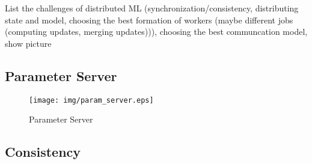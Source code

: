 List the challenges of distributed ML (synchronization/consistency, distributing state and model, choosing the best formation of workers (maybe different jobs (computing updates, merging updates))), choosing the best communcation model, show picture


\subsection{Parameter Server}

\begin{figure}[h]
\centering
\texttt{[image: img/param\_server.eps]}
\caption{Parameter Server}
\label{fig:param_server}
\end{figure}


\subsection{Consistency}

